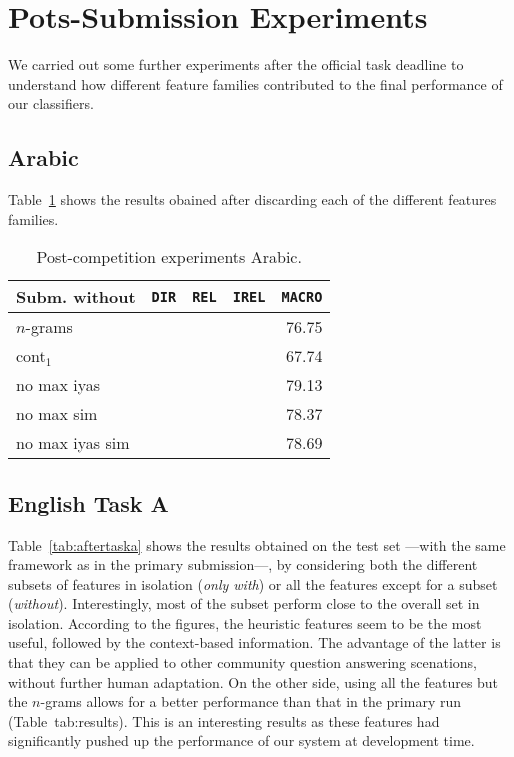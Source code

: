 \section{Pots-Submission Experiments}
\label{sec:discussion}

We carried out some further experiments after the official task deadline to 
understand how different feature families contributed to the final performance 
of our classifiers. 


\subsection{Arabic} \label{sec:discussionArabic}

Table~\ref{tab:aftertaskarabic} shows the results obained after discarding each 
of the different features families.

\begin{table}%
\begin{tabular}{|l|crrr|}
\hline  
 Subm. without& \bf \texttt{DIR} & \bf \texttt{REL} & \bf \texttt{IREL} & 
\bf \texttt{MACRO} \\\hline
 $n$-grams	&	&	&	& 76.75	\\
 cont$_1$	&	&	&	& 67.74	\\
 no max iyas	&	&	&	& 79.13	\\
 no max sim	&	&	&	& 78.37	\\
 no max iyas sim&	&	&	& 78.69	\\ 
  \hline
 \end{tabular}
 \caption{Post-competition experiments Arabic.\label{tab:aftertaskarabic}}
 \end{table}

\subsection{English Task A} \label{sec:discussiona}

Table~\ref{tab:aftertaska} shows the results obtained on the test set ---with 
the same framework as in the primary submission---, by considering both the 
different subsets of features in isolation (\textit{only with}) or all the 
features except for a subset (\textit{without}). Interestingly, most of the 
subset perform close to the overall set in isolation. According to the figures, 
the heuristic features seem to be the most useful, followed by the context-based 
information. The advantage of the latter is that they can be applied to other 
community question answering scenations, without further human adaptation. 
On the other side, using all the features but the $n$-grams allows for a better 
performance than that in the primary run (\cf Table~{tab:results}). This is an 
interesting results as these features had significantly pushed up the 
performance of our system at development time. 



